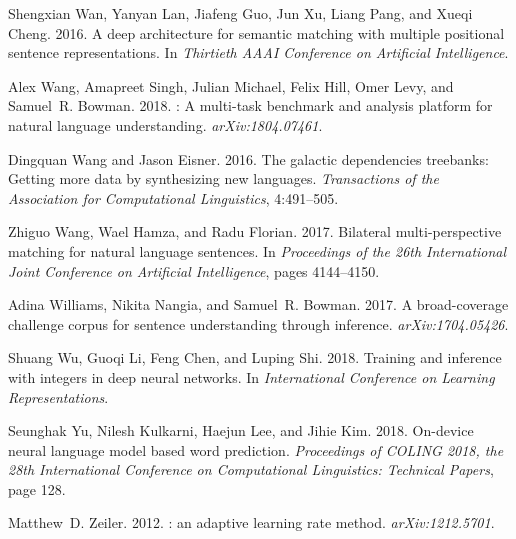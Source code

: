 \documentclass[11pt,a4paper]{article}
\begin{document}
\begin{thebibliography}{40}
Shengxian Wan, Yanyan Lan, Jiafeng Guo, Jun Xu, Liang Pang, and Xueqi Cheng.
  2016.
\newblock A deep architecture for semantic matching with multiple positional
  sentence representations.
\newblock In \emph{Thirtieth AAAI Conference on Artificial Intelligence}.

Alex Wang, Amapreet Singh, Julian Michael, Felix Hill, Omer Levy, and Samuel~R.
  Bowman. 2018.
: A multi-task benchmark and analysis platform for natural
  language understanding.
\newblock \emph{arXiv:1804.07461}.

Dingquan Wang and Jason Eisner. 2016.
\newblock The galactic dependencies treebanks: Getting more data by
  synthesizing new languages.
\newblock \emph{Transactions of the Association for Computational Linguistics},
  4:491--505.

Zhiguo Wang, Wael Hamza, and Radu Florian. 2017.
\newblock Bilateral multi-perspective matching for natural language sentences.
\newblock In \emph{Proceedings of the 26th International Joint Conference on
  Artificial Intelligence}, pages 4144--4150.

Adina Williams, Nikita Nangia, and Samuel~R. Bowman. 2017.
\newblock A broad-coverage challenge corpus for sentence understanding through
  inference.
\newblock \emph{arXiv:1704.05426}.

Shuang Wu, Guoqi Li, Feng Chen, and Luping Shi. 2018.
\newblock Training and inference with integers in deep neural networks.
\newblock In \emph{International Conference on Learning Representations}.

Seunghak Yu, Nilesh Kulkarni, Haejun Lee, and Jihie Kim. 2018.
\newblock On-device neural language model based word prediction.
\newblock \emph{Proceedings of COLING 2018, the 28th International Conference
  on Computational Linguistics: Technical Papers}, page 128.

Matthew~D. Zeiler. 2012.
: an adaptive learning rate method.
\newblock \emph{arXiv:1212.5701}.


\end{thebibliography}
\end{document}
